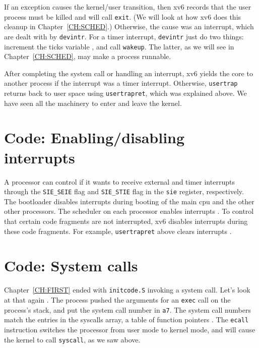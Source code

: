 If an exception causes the kernel/user transition, then xv6 records
that the user process must be killed and will call \lstinline{exit}.
(We will look at how xv6 does this cleanup in Chapter~\ref{CH:SCHED}.)
Otherwise, the cause was an interrupt, which are dealt with by
\lstinline{devintr}.  For a timer
interrupt, \lstinline{devintr} just do two things: increment the ticks
variable , and call
\lstinline{wakeup}.  The latter, as
we will see in Chapter~\ref{CH:SCHED}, may make a process runnable.

After completing the system call or handling an interrupt, xv6 yields
the core to another process if the interrupt was a timer interrupt.
Otherwise, \lstinline{usertrap} returns back to user space using
\lstinline{usertrapret}, which was explained above.  We have seen all
the machinery to enter and leave the kernel.
 
\section{Code: Enabling/disabling interrupts}

A processor can control if it wants to receive external and timer
interrupts through the \lstinline{SIE_SEIE}
 flag and \lstinline{SIE_STIE}
 flag in the \texttt{sie}
register, respectively.  The bootloader disables interrupts during
booting of the main cpu and the other other processors.  The scheduler on
each processor enables interrupts .  To
control that certain code fragments are not interrupted, xv6 disables
interrupts during these code fragments.  For example,
\lstinline{usertrapret} above clears interrupts
.

\section{Code: System calls}

Chapter~\ref{CH:FIRST} ended with 
\lstinline{initcode.S}
invoking a system call.
Let's look at that again
.
The process pushed the arguments
for an 
\lstinline{exec}
call on the process's stack, and put the
system call number in
\texttt{a7}.
The system call numbers match the entries in the syscalls array,
a table of function pointers
.
The \lstinline{ecall} instruction
switches the processor from user mode to kernel mode, and will
cause the kernel to call \lstinline{syscall}, as we saw above.

